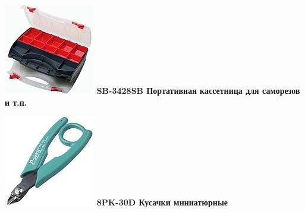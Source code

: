 \documentclass{magazine}
\begin{document}
{\noindent\includegraphics[width=\columnwidth]{fig/00/pros/SB-3428SB.jpg}
\textbf{SB-3428SB Портативная кассетница для саморезов и т.п.}


\noindent\includegraphics[width=\columnwidth]{fig/00/pros/8PK-30D.jpg}
\textbf{8PK-30D Кусачки миниатюрные}

}
\end{document}
